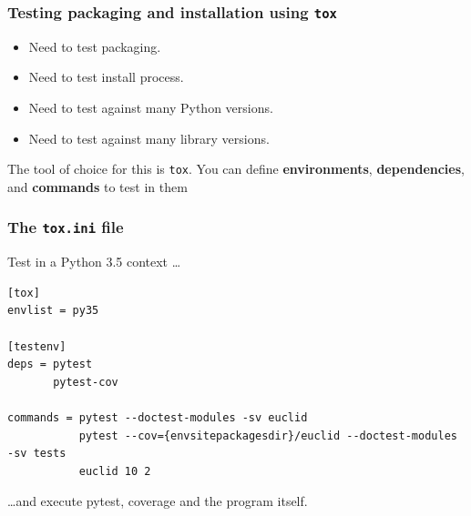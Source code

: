 \documentclass{beamer} %
\newcommand\emc[1]{\textcolor{brightblue}{\textbf{#1}}}
\begin{document}
\begin{frame}

\frametitle{Testing packaging and installation using \texttt{tox}}

\begin{itemize}
  \item Need to test packaging.
  \item Need to test install process.
  \item Need to test against many Python versions.
  \item Need to test against many library versions.
  \end{itemize}

  \vspace{5mm}
  The tool of choice for this is \texttt{tox}. You can define \emc{environments}, \emc{dependencies}, and \emc{commands} to test in them

\end{frame}

\begin{frame}[fragile]

\frametitle{The \texttt{tox.ini} file}

Test in a Python 3.5 context \ldots 
\begin{scriptsize}
\begin{verbatim}
[tox]
envlist = py35

[testenv]
deps = pytest
       pytest-cov

commands = pytest --doctest-modules -sv euclid
           pytest --cov={envsitepackagesdir}/euclid --doctest-modules -sv tests
           euclid 10 2
\end{verbatim}
\end{scriptsize}
\ldots and execute pytest, coverage and the program itself.

\end{frame}
\end{document}
